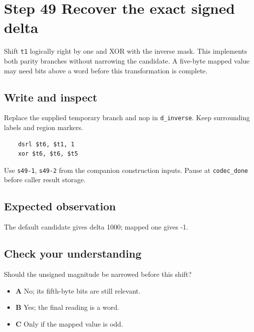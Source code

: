 \section{Step 49 Recover the exact signed delta}\label{delta-s49}

Shift \texttt{t1} logically right by one and XOR with the inverse mask. This implements both parity branches without narrowing the candidate. A five-byte mapped value may need bits above a word before this transformation is complete.

\subsection{Write and inspect}
Replace the supplied temporary branch and nop in \texttt{d\_inverse}. Keep surrounding labels and region markers.

\begin{verbatim}
    dsrl $t6, $t1, 1
    xor $t6, $t6, $t5
\end{verbatim}
Use \texttt{s49-1}, \texttt{s49-2} from the companion construction inputs. Pause at \texttt{codec\_done} before caller result storage.

\subsection{Expected observation}
The default candidate gives delta 1000; mapped one gives -1.

\subsection{Check your understanding}
Should the unsigned magnitude be narrowed before this shift?

\begin{itemize}
\item \textbf{A} No; its fifth-byte bits are still relevant.
\item \textbf{B} Yes; the final reading is a word.
\item \textbf{C} Only if the mapped value is odd.
\end{itemize}
